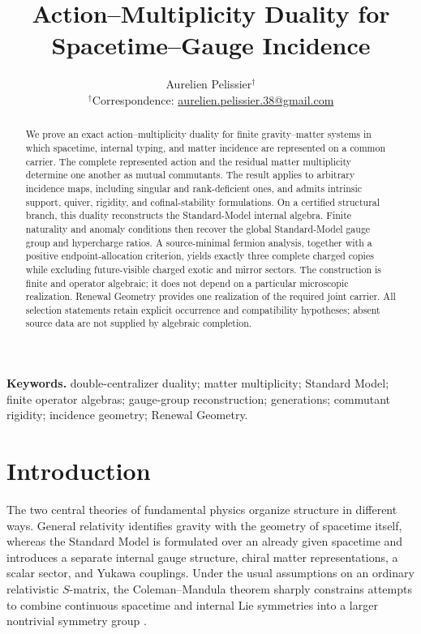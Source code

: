 \documentclass[11pt]{article}
\title{\textbf{Action--Multiplicity Duality for Spacetime--Gauge Incidence}}
\author{Aurelien Pelissier$^{\dagger}$\\
{\small $^{\dagger}$Correspondence: \href{mailto:aurelien.pelissier.38@gmail.com}{aurelien.pelissier.38@gmail.com}}}
\date{}
\numberwithin{equation}{section}
\theoremstyle{definition}
\theoremstyle{remark}
\begin{document}
\maketitle


\begin{abstract}
We prove an exact action--multiplicity duality for finite gravity--matter systems in which spacetime, internal typing, and matter incidence are represented on a common carrier. The complete represented action and the residual matter multiplicity determine one another as mutual commutants. The result applies to arbitrary incidence maps, including singular and rank-deficient ones, and admits intrinsic support, quiver, rigidity, and cofinal-stability formulations.
%
On a certified structural branch, this duality reconstructs the Standard-Model internal algebra. Finite naturality and anomaly conditions then recover the global Standard-Model gauge group and hypercharge ratios. A source-minimal fermion analysis, together with a positive endpoint-allocation criterion, yields exactly three complete charged copies while excluding future-visible charged exotic and mirror sectors. The construction is finite and operator algebraic; it does not depend on a particular microscopic realization. Renewal Geometry provides one realization of the required joint carrier.
All selection statements retain explicit occurrence and compatibility hypotheses; absent source data are not supplied by algebraic completion.
\end{abstract}


\medskip
\noindent\textbf{Keywords.}
double-centralizer duality; matter multiplicity; Standard Model;
finite operator algebras; gauge-group reconstruction; generations;
commutant rigidity; incidence geometry; Renewal Geometry.


\section{Introduction}
\label{sec:introduction}
The two central theories of fundamental physics organize structure in
different ways.  General relativity identifies gravity with the geometry of
spacetime itself, whereas the Standard Model is formulated over an already
given spacetime and introduces a separate internal gauge structure, chiral
matter representations, a scalar sector, and Yukawa couplings.  Under the
usual assumptions on an ordinary relativistic $S$-matrix, the
Coleman--Mandula theorem sharply constrains attempts to combine continuous
spacetime and internal Lie symmetries into a larger nontrivial symmetry group
\cite{ColemanMandula1967}.
\end{document}
